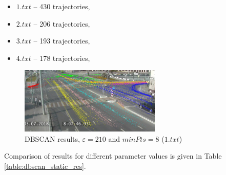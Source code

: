 \begin{itemize}
	\setlength\itemsep{0em}
	\item $1.txt$ -- 430 trajectories,
	\item $2.txt$ -- 206 trajectories,
	\item $3.txt$ -- 193 trajectories,
	\item $4.txt$ -- 178 trajectories,
\end{itemize}

\begin{figure}[!htb]
	\centering{}
	\includegraphics[width=0.6\textwidth]{images/cl-res/dbscan-cl11.png}
	\caption{DBSCAN results, $\varepsilon = 210$ and $minPts = 8$ ($1.txt$)}
	\label{fig:dbscan-cl11}
\end{figure}

Comparison of results for different parameter values is given in Table \ref{table:dbscan_static_res}.
	
